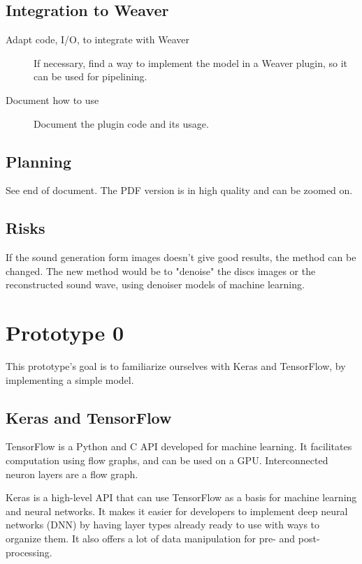 \documentclass[12pt, twoside]{article}
\begin{document}
\subsection{Integration to Weaver}
\begin{description}
	\item[Adapt code, I/O, to integrate with Weaver] If necessary, find a way to implement the model in a Weaver plugin, so it can be used for pipelining.
	\item[Document how to use] Document the plugin code and its usage.
\end{description}
\subsection{Planning}
See end of document. The PDF version is in high quality and can be zoomed on.
\subsection{Risks}
If the sound generation form images doesn't give good results, the method can be changed. The new method would be to "denoise" the discs images or the reconstructed sound wave, using denoiser models of machine learning.

\section{Prototype 0}
This prototype's goal is to familiarize ourselves with Keras and TensorFlow, by implementing a simple model.
\subsection{Keras and TensorFlow}
TensorFlow is a Python and C API developed for machine learning\cite{tf}. It facilitates computation using flow graphs, and can be used on a GPU. Interconnected neuron layers are a flow graph.

Keras is a high-level API that can use TensorFlow as a basis for machine learning and neural networks\cite{keras}. It makes it easier for developers to implement deep neural networks (DNN) by having layer types already ready to use with ways to organize them. It also offers a lot of data manipulation for pre- and post-processing.
\end{document}
